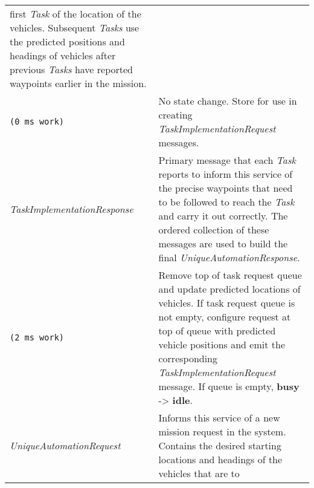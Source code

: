 \begin{longtable}[c]{@{}ll@{}}
\begin{minipage}[t]{0.65\columnwidth}
first \emph{Task} of the location of the vehicles. Subsequent
\emph{Tasks} use the predicted positions and headings of vehicles after
previous \emph{Tasks} have reported waypoints earlier in the mission.
\strut\end{minipage}\tabularnewline
\begin{minipage}[t]{0.29\columnwidth}\raggedright\strut
\begin{verbatim}
(0 ms work)
\end{verbatim}
\strut\end{minipage} &
\begin{minipage}[t]{0.65\columnwidth}\raggedright\strut
No state change. Store for use in creating
\emph{TaskImplementationRequest} messages.
\strut\end{minipage}\tabularnewline
\begin{minipage}[t]{0.29\columnwidth}\raggedright\strut
\emph{TaskImplementationResponse}
\strut\end{minipage} &
\begin{minipage}[t]{0.65\columnwidth}\raggedright\strut
Primary message that each \emph{Task} reports to inform this service of
the precise waypoints that need to be followed to reach the \emph{Task}
and carry it out correctly. The ordered collection of these messages are
used to build the final \emph{UniqueAutomationResponse}.
\strut\end{minipage}\tabularnewline
\begin{minipage}[t]{0.29\columnwidth}\raggedright\strut
\begin{verbatim}
(2 ms work)
\end{verbatim}
\strut\end{minipage} &
\begin{minipage}[t]{0.65\columnwidth}\raggedright\strut
Remove top of task request queue and update predicted locations of
vehicles. If task request queue is not empty, configure request at top
of queue with predicted vehicle positions and emit the corresponding
\emph{TaskImplementationRequest} message. If queue is empty,
\textbf{busy} -\textgreater{} \textbf{idle}.
\strut\end{minipage}\tabularnewline
\begin{minipage}[t]{0.29\columnwidth}\raggedright\strut
\emph{UniqueAutomationRequest}
\strut\end{minipage} &
\begin{minipage}[t]{0.65\columnwidth}\raggedright\strut
Informs this service of a new mission request in the system. Contains
the desired starting locations and headings of the vehicles that are to

\end{minipage}
\end{longtable}
